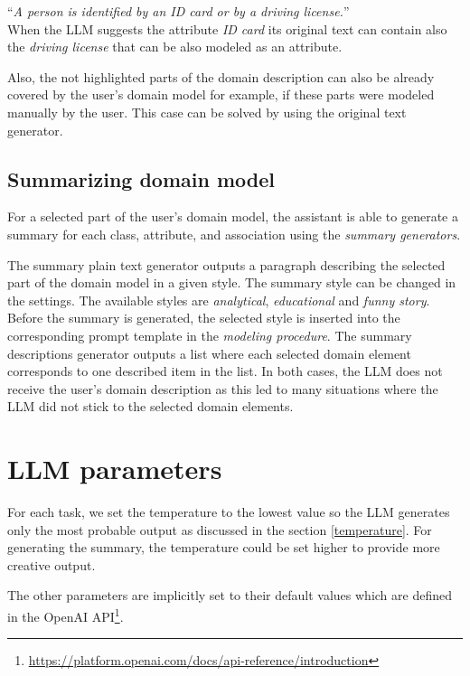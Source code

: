 \noindent{} ``\textit{A person is identified by an ID card or by a driving license.}'' \\

\noindent{} When the LLM suggests the attribute \textit{ID card} its original text can contain also the \textit{driving license} that can be also modeled as an attribute.

Also, the not highlighted parts of the domain description can also be already covered by the user's domain model for example, if these parts were modeled manually by the user. This case can be solved by using the original text generator.


\subsection{Summarizing domain model}
\label{sec:summarising_domain_model}

For a selected part of the user's domain model, the assistant is able to generate a summary for each class, attribute, and association using the \emph{summary generators}.

The summary plain text generator outputs a paragraph describing the selected part of the domain model in a given style. The summary style can be changed in the settings. The available styles are \textit{analytical}, \textit{educational} and \textit{funny story}. Before the summary is generated, the selected style is inserted into the corresponding prompt template in the \emph{modeling procedure}. The summary descriptions generator outputs a list where each selected domain element corresponds to one described item in the list. In both cases, the LLM does not receive the user's domain description as this led to many situations where the LLM did not stick to the selected domain elements.


\section{LLM parameters}

For each task, we set the temperature to the lowest value so the LLM generates only the most probable output as discussed in the section \ref{temperature}. For generating the summary, the temperature could be set higher to provide more creative output.

The other parameters are implicitly set to their default values which are defined in the OpenAI API\footnote{\url{https://platform.openai.com/docs/api-reference/introduction}}.


